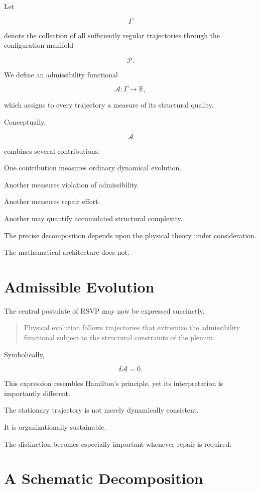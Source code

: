\documentclass[11pt,oneside]{book}
\numberwithin{equation}{chapter}
\theoremstyle{definition}
\theoremstyle{plain}
\begin{document}
Let

\[
\Gamma
\]

denote the collection of all sufficiently regular trajectories through the
configuration manifold

\[
\mathcal P.
\]

We define an admissibility functional

\[
\mathcal A :
\Gamma
\rightarrow
\mathbb R,
\]

which assigns to every trajectory a measure of its structural quality.

Conceptually,

\[
\mathcal A
\]

combines several contributions.

One contribution measures ordinary dynamical evolution.

Another measures violation of admissibility.

Another measures repair effort.

Another may quantify accumulated structural complexity.

The precise decomposition depends upon the physical theory under
consideration.

The mathematical architecture does not.

\section{Admissible Evolution}

The central postulate of RSVP may now be expressed succinctly.

\begin{quote}
Physical evolution follows trajectories that extremize the admissibility
functional subject to the structural constraints of the plenum.
\end{quote}

Symbolically,

\[
\delta\mathcal A =0.
\]

This expression resembles Hamilton's principle, yet its interpretation is
importantly different.

The stationary trajectory is not merely dynamically consistent.

It is organizationally sustainable.

The distinction becomes especially important whenever repair is required.

\section{A Schematic Decomposition}
\end{document}

